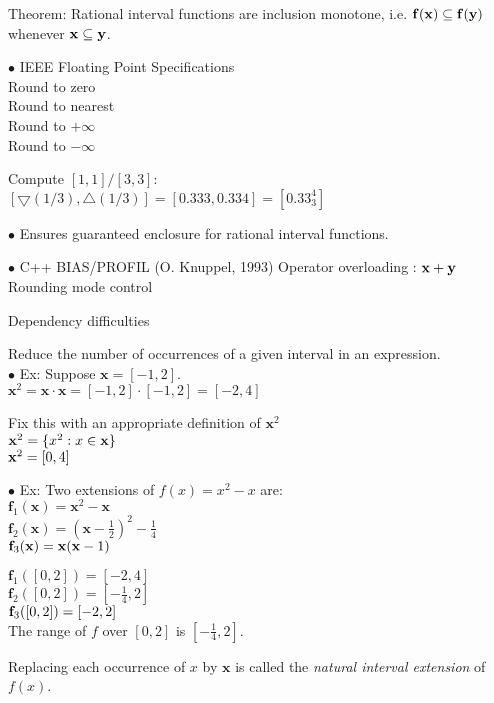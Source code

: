 \documentclass{slides}
\begin{document}
\begin{slide}

Theorem: Rational interval functions are inclusion monotone, i.e. 
${\bf f}({\bf x}) \subseteq  {\bf f}({\bf y})$ whenever ${\bf x} 
\subseteq  {\bf y}$.


$\bullet$ IEEE Floating Point Specifications \\
Round to zero \\
Round to nearest \\
Round to $+\infty$ \\
Round to $-\infty$ 

Compute $ [1,1]/[3,3]$: \\
$[\bigtriangledown(1/3),\bigtriangleup(1/3)] = [0.333,0.334]=[0.33_3^4]$

$\bullet $ Ensures guaranteed enclosure for rational interval functions.

$\bullet$ C++ BIAS/PROFIL (O. Knuppel, 1993)
Operator overloading : ${\bf x}+{\bf y}$ \\
Rounding mode control
\end{slide}
\begin{slide}
\begin{center}
Dependency difficulties
\end{center}
Reduce the number of occurrences of a given interval in an expression.
\\
$\bullet$ Ex:  Suppose $\mathbf{x} = [-1,2]$. \\
$\mathbf{x}^2 = \mathbf{x} \cdot \mathbf{x} = [-1,2] \cdot [-1,2] = [-2,4]$ 

Fix this with an appropriate definition of $\mathbf{x}^2$ \\
$\mathbf{x}^2 = \{ x^2 : x \in {\bf x} \}$ \\
${\bf x}^2 = [0,4]$ 

$\bullet$ Ex:  Two extensions of $f(x) = x^2 - x$ are: \\
$\mathbf{f}_1 (\mathbf{x}) = \mathbf{x}^2 - \mathbf{x}$ \\
$\mathbf{f}_2 (\mathbf{x}) = (\mathbf{x}-\frac{1}{2})^2 - \frac{1}{4}$ \\
$\mathbf{f}_3 ({\bf x}) = {\bf x} ({\bf x} -1)$ 

$\mathbf{f}_1([0,2]) = [-2,4]$ \\
$\mathbf{f}_2([0,2]) = [- \frac{1}{4},2]$ \\
${\bf f}_3([0,2]) = [-2,2]$
\\
The range of $f$ over $[0,2]$ is $[- \frac{1}{4},2]$.

Replacing each occurrence of $x$ by $\mathbf{x}$ is called the {\it natural
interval extension} of $f(x)$.\\

\end{slide}
\end{document}
